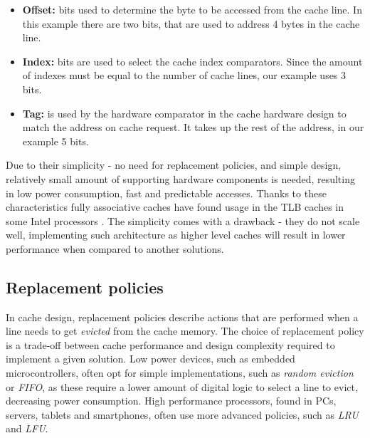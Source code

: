 \begin{itemize}
	\item \textbf{Offset:} bits used to determine the byte to be accessed from the cache line. In this example there are two bits, that are used to address 4 bytes in the cache line.
	\item \textbf{Index:}  bits are used to select the cache index comparators. Since the amount of indexes must be equal to the number of cache lines, our example uses 3 bits.
	\item \textbf{Tag:} is used by the hardware comparator in the cache hardware design to match the address on cache request. It takes up the rest of the address, in our example 5 bits.
\end{itemize}

\noindent Due to their simplicity - no need for replacement policies, and simple design, relatively small amount of supporting hardware components is needed, resulting in low power %
consumption, fast and predictable accesses. Thanks to these characteristics fully associative caches have found usage in the TLB caches in some Intel processors \cite{whatevery}. The simplicity
comes with a drawback - they do not scale well, implementing such architecture as higher level caches will result in lower performance when compared to another solutions. %


%
\subsection{Replacement policies} \label{sec:eviction_policies}
In cache design, replacement policies describe actions that are performed when a line needs to get \textit{evicted} from the cache memory.
The choice of replacement policy is a trade-off between cache performance and design complexity required to implement a given solution. Low power
devices, such as embedded microcontrollers, often opt for simple implementations, such as \textit{random eviction} or \textit{FIFO}, as these require %
a lower amount of digital logic to select a line to evict, decreasing power consumption. High performance processors, found in PCs, servers, tablets and smartphones,
often use more advanced policies, such as \textit{LRU} and \textit{LFU}.

